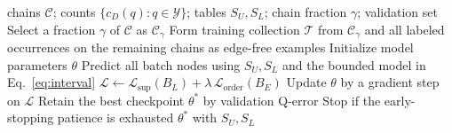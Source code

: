 \begin{algorithm}[t]
\caption{BOLT training}
\label{alg:training}
\begin{algorithmic}[1]
\Require chains $\mathcal{C}$; counts $\{c_D(q):q\in\mathcal{Y}\}$;
  tables $S_U,S_L$; chain fraction $\gamma$; validation set
\State Select a fraction $\gamma$ of $\mathcal{C}$ as $\mathcal{C}_\gamma$
\State Form training collection $\mathcal{T}$ from $\mathcal{C}_\gamma$ and
  all labeled occurrences on the remaining chains as edge-free examples
\State Initialize model parameters $\theta$
    \State Predict all batch nodes using $S_U,S_L$ and the bounded model
      in Eq.~\eqref{eq:interval}
    \State $\mathcal{L}\gets\mathcal{L}_{\mathrm{sup}}(B_L)
      +\lambda\,\mathcal{L}_{\mathrm{order}}(B_E)$
    \State Update $\theta$ by a gradient step on $\mathcal{L}$
  \EndFor
  \State Retain the best checkpoint $\theta^*$ by validation Q-error
  \State Stop if the early-stopping patience is exhausted
\EndFor
\State \Return $\theta^*$ with $S_U,S_L$
\end{algorithmic}
\end{algorithm}
